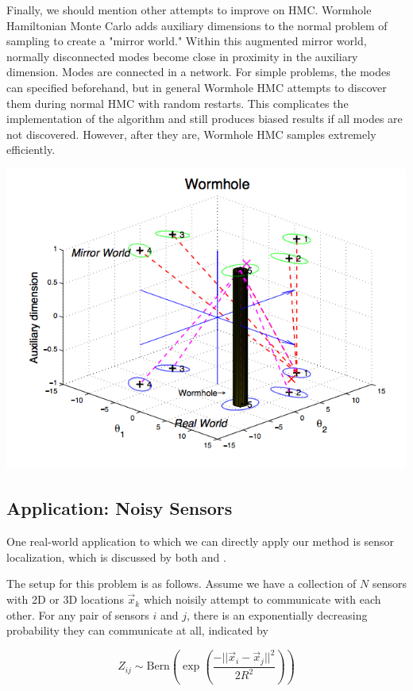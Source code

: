 \documentclass{article}
\begin{document}
Finally, we should mention other attempts to improve on HMC. Wormhole
Hamiltonian Monte Carlo \cite{wormhole} adds auxiliary dimensions to the normal
problem of sampling to create a "mirror world." Within this augmented mirror
world, normally disconnected modes become close in proximity in the auxiliary
dimension. Modes are connected in a network. For simple problems, the modes can
specified beforehand, but in general Wormhole HMC attempts to discover them
during normal HMC with random restarts. This complicates the implementation of
the algorithm and still produces biased results if all modes are not
discovered. However, after they are, Wormhole HMC samples extremely
efficiently.

\includegraphics[width=\textwidth]{wormholehmc.png}

\subsection{Application: Noisy Sensors}

One real-world application to which we can directly apply our method is sensor
localization, which is discussed by both \cite{wormhole} and \cite{darting}.

The setup for this problem is as follows. Assume we have a collection of
$N$ sensors with 2D or 3D locations $\vec{x}_k$ which noisily attempt
to communicate with each other. For any pair of sensors $i$ and $j$,
there is an exponentially decreasing probability they can communicate at all,
indicated by

$$ Z_{ij} \sim \text{Bern}\left(\exp\left(\frac{-||\vec{x}_i -
\vec{x}_j||^2}{2R^2}\right)\right) $$
\end{document}
